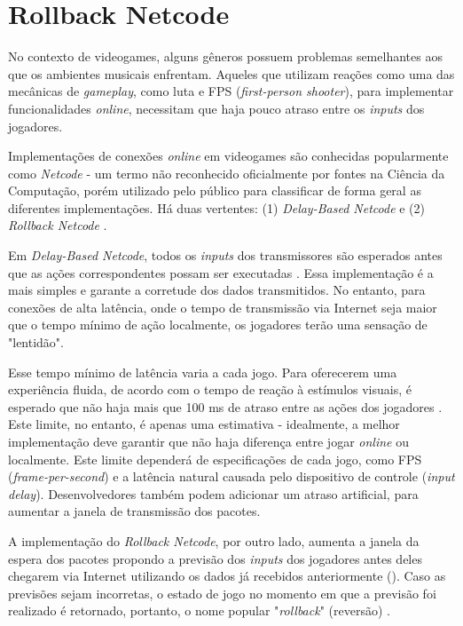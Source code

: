 \section{Rollback Netcode}

No contexto de videogames, alguns gêneros possuem problemas semelhantes aos que os ambientes musicais enfrentam. Aqueles que utilizam reações como uma das mecânicas de \textit{gameplay}, como luta e FPS (\textit{first-person shooter}), para implementar funcionalidades \textit{online}, necessitam que haja pouco atraso entre os \textit{inputs} dos jogadores.

Implementações de conexões \textit{online} em videogames são conhecidas popularmente como \textit{Netcode} - um termo não reconhecido oficialmente por fontes na Ciência da Computação, porém utilizado pelo público para classificar de forma geral as diferentes implementações. Há duas vertentes: (1) \textit{Delay-Based Netcode} e (2) \textit{Rollback Netcode} \cite{rollback}.

Em \textit{Delay-Based Netcode}, todos os \textit{inputs} dos transmissores são esperados antes que as ações correspondentes possam ser executadas \cite{rollback}. Essa implementação é a mais simples e garante a corretude dos dados transmitidos. No entanto, para conexões de alta latência, onde o tempo de transmissão via Internet seja maior que o tempo mínimo de ação localmente, os jogadores terão uma sensação de "lentidão".

Esse tempo mínimo de latência varia a cada jogo. Para oferecerem uma experiência fluida, de acordo com o tempo de reação à estímulos visuais, é esperado que não haja mais que 100 ms de atraso entre as ações dos jogadores \cite{pubnub}. Este limite, no entanto, é apenas uma estimativa - idealmente, a melhor implementação deve garantir que não haja diferença entre jogar \textit{online} ou localmente. Este limite dependerá de especificações de cada jogo, como FPS (\textit{frame-per-second}) e a latência natural causada pelo dispositivo de controle (\textit{input delay}). Desenvolvedores também podem adicionar um atraso artificial, para aumentar a janela de transmissão dos pacotes.

A implementação do \textit{Rollback Netcode}, por outro lado, aumenta a janela da espera dos pacotes propondo a previsão dos \textit{inputs} dos jogadores antes deles chegarem via Internet utilizando os dados já recebidos anteriormente (). Caso as previsões sejam incorretas, o estado de jogo no momento em que a previsão foi realizado é retornado, portanto, o nome popular "\textit{rollback}" (reversão) \cite{rollback}.


